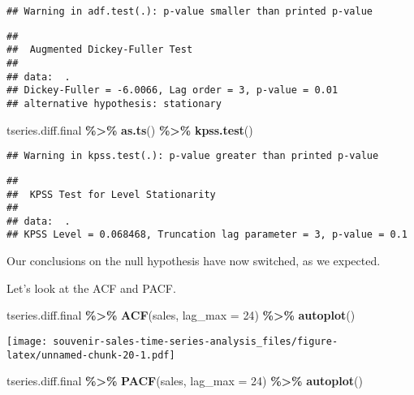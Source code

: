 \documentclass[
]{article}
\newenvironment{Shaded}{\begin{snugshade}}{\end{snugshade}}
\newcommand{\AttributeTok}[1]{\textcolor[rgb]{0.13,0.29,0.53}{#1}}
\newcommand{\DecValTok}[1]{\textcolor[rgb]{0.00,0.00,0.81}{#1}}
\newcommand{\FunctionTok}[1]{\textcolor[rgb]{0.13,0.29,0.53}{\textbf{#1}}}
\newcommand{\NormalTok}[1]{#1}
\newcommand{\SpecialCharTok}[1]{\textcolor[rgb]{0.81,0.36,0.00}{\textbf{#1}}}
\begin{document}
\begin{verbatim}
## Warning in adf.test(.): p-value smaller than printed p-value
\end{verbatim}

\begin{verbatim}
## 
##  Augmented Dickey-Fuller Test
## 
## data:  .
## Dickey-Fuller = -6.0066, Lag order = 3, p-value = 0.01
## alternative hypothesis: stationary
\end{verbatim}

\begin{Shaded}
\begin{Highlighting}[]
\NormalTok{tseries.diff.final }\SpecialCharTok{\%\textgreater{}\%} \FunctionTok{as.ts}\NormalTok{() }\SpecialCharTok{\%\textgreater{}\%} \FunctionTok{kpss.test}\NormalTok{()}
\end{Highlighting}
\end{Shaded}

\begin{verbatim}
## Warning in kpss.test(.): p-value greater than printed p-value
\end{verbatim}

\begin{verbatim}
## 
##  KPSS Test for Level Stationarity
## 
## data:  .
## KPSS Level = 0.068468, Truncation lag parameter = 3, p-value = 0.1
\end{verbatim}

Our conclusions on the null hypothesis have now switched, as we
expected.

Let's look at the ACF and PACF.

\begin{Shaded}
\begin{Highlighting}[]
\NormalTok{tseries.diff.final }\SpecialCharTok{\%\textgreater{}\%} \FunctionTok{ACF}\NormalTok{(sales, }\AttributeTok{lag\_max =} \DecValTok{24}\NormalTok{) }\SpecialCharTok{\%\textgreater{}\%} \FunctionTok{autoplot}\NormalTok{()}
\end{Highlighting}
\end{Shaded}

\texttt{[image: souvenir-sales-time-series-analysis\_files/figure-latex/unnamed-chunk-20-1.pdf]}

\begin{Shaded}
\begin{Highlighting}[]
\NormalTok{tseries.diff.final }\SpecialCharTok{\%\textgreater{}\%} \FunctionTok{PACF}\NormalTok{(sales, }\AttributeTok{lag\_max =} \DecValTok{24}\NormalTok{) }\SpecialCharTok{\%\textgreater{}\%} \FunctionTok{autoplot}\NormalTok{()}
\end{Highlighting}
\end{Shaded}
\end{document}
